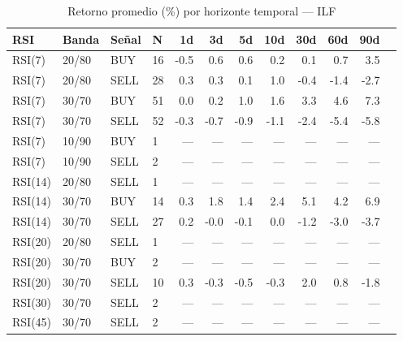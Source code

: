 %
\begin{table}[htbp]
    \centering
    \caption{Retorno promedio (\%) por horizonte temporal --- ILF}
    \label{tab:media_ilf}
    \small
    \begin{tabular}{llllrrrrrrrr}
        \toprule
        \textbf{RSI} & \textbf{Banda} & \textbf{Se\~{n}al} & \textbf{N} & \textbf{1d} & \textbf{3d} & \textbf{5d} & \textbf{10d} & \textbf{30d} & \textbf{60d} & \textbf{90d} \\
        \midrule
        RSI(7) & 20/80 & BUY & 16 & -0.5 & 0.6 & 0.6 & 0.2 & 0.1 & 0.7 & 3.5 \\
        RSI(7) & 20/80 & SELL & 28 & 0.3 & 0.3 & 0.1 & 1.0 & -0.4 & -1.4 & -2.7 \\
        RSI(7) & 30/70 & BUY & 51 & 0.0 & 0.2 & 1.0 & 1.6 & 3.3 & 4.6 & 7.3 \\
        RSI(7) & 30/70 & SELL & 52 & -0.3 & -0.7 & -0.9 & -1.1 & -2.4 & -5.4 & -5.8 \\
        RSI(7) & 10/90 & BUY & 1 & --- & --- & --- & --- & --- & --- & --- \\
        RSI(7) & 10/90 & SELL & 2 & --- & --- & --- & --- & --- & --- & --- \\
        \midrule
        RSI(14) & 20/80 & SELL & 1 & --- & --- & --- & --- & --- & --- & --- \\
        RSI(14) & 30/70 & BUY & 14 & 0.3 & 1.8 & 1.4 & 2.4 & 5.1 & 4.2 & 6.9 \\
        RSI(14) & 30/70 & SELL & 27 & 0.2 & -0.0 & -0.1 & 0.0 & -1.2 & -3.0 & -3.7 \\
        \midrule
        RSI(20) & 20/80 & SELL & 1 & --- & --- & --- & --- & --- & --- & --- \\
        RSI(20) & 30/70 & BUY & 2 & --- & --- & --- & --- & --- & --- & --- \\
        RSI(20) & 30/70 & SELL & 10 & 0.3 & -0.3 & -0.5 & -0.3 & 2.0 & 0.8 & -1.8 \\
        \midrule
        RSI(30) & 30/70 & SELL & 2 & --- & --- & --- & --- & --- & --- & --- \\
        \midrule
        RSI(45) & 30/70 & SELL & 2 & --- & --- & --- & --- & --- & --- & --- \\
        \bottomrule
    \end{tabular}
\end{table}
